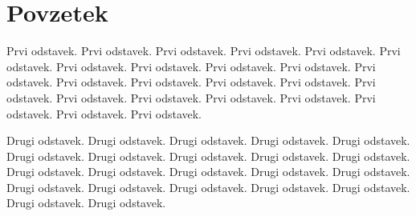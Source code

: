 
\chapter*{Povzetek}

\noindent Prvi odstavek. Prvi odstavek. Prvi odstavek. Prvi odstavek.
Prvi odstavek. Prvi odstavek. Prvi odstavek. Prvi odstavek. Prvi odstavek.
Prvi odstavek. Prvi odstavek. Prvi odstavek. Prvi odstavek. Prvi odstavek.
Prvi odstavek. Prvi odstavek. Prvi odstavek. Prvi odstavek. Prvi odstavek.
Prvi odstavek. Prvi odstavek. Prvi odstavek. Prvi odstavek.

Drugi odstavek. Drugi odstavek. Drugi odstavek. Drugi odstavek. Drugi
odstavek. Drugi odstavek. Drugi odstavek. Drugi odstavek. Drugi odstavek.
Drugi odstavek. Drugi odstavek. Drugi odstavek. Drugi odstavek. Drugi
odstavek. Drugi odstavek. Drugi odstavek. Drugi odstavek. Drugi odstavek.
Drugi odstavek. Drugi odstavek. Drugi odstavek. Drugi odstavek. 
